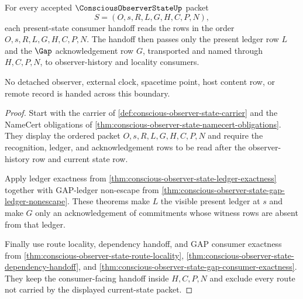 \begin{theorem}
\label{thm:conscious-observer-state-current-ledger-handoff}
For every accepted $\ConsciousObserverStateUp$ packet
$$
S=(O,s,R,L,G,H,C,P,N),
$$
each present-state consumer handoff reads the rows in the order
$O,s,R,L,G,H,C,P,N$. The handoff then passes only the present ledger row $L$
and the $\Gap$ acknowledgement row $G$, transported and named through
$H,C,P,N$, to observer-history and locality consumers.

No detached observer, external clock, spacetime point, host content row, or
remote record is handed across this boundary.
\end{theorem}
\begin{proof}
Start with the carrier of \autoref{def:conscious-observer-state-carrier} and
the NameCert obligations of
\autoref{thm:conscious-observer-state-namecert-obligations}. They display the
ordered packet $O,s,R,L,G,H,C,P,N$ and require the recognition, ledger, and
acknowledgement rows to be read after the observer-history row and current
state row.

Apply ledger exactness from
\autoref{thm:conscious-observer-state-ledger-exactness} together with
GAP-ledger non-escape from
\autoref{thm:conscious-observer-state-gap-ledger-nonescape}. These theorems
make $L$ the visible present ledger at $s$ and make $G$ only an
acknowledgement of commitments whose witness rows are absent from that ledger.

Finally use route locality, dependency handoff, and GAP consumer exactness from
\autoref{thm:conscious-observer-state-route-locality},
\autoref{thm:conscious-observer-state-dependency-handoff}, and
\autoref{thm:conscious-observer-state-gap-consumer-exactness}. They keep the
consumer-facing handoff inside $H,C,P,N$ and exclude every route not carried by
the displayed current-state packet.
\end{proof}

